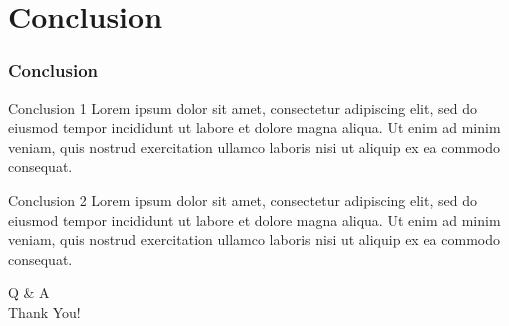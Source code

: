 \documentclass[aspectratio=43, 9pt, utf8, mathserif]{beamer}
\begin{document}
\section{Conclusion}\label{sec:conclusion}
\begin{frame}
\frametitle{Conclusion}
\begin{block}{Conclusion 1}
    Lorem ipsum dolor sit amet, consectetur adipiscing elit, sed do eiusmod tempor incididunt ut labore et dolore magna aliqua.
    Ut enim ad minim veniam, quis nostrud exercitation ullamco laboris nisi ut aliquip ex ea commodo consequat.
\end{block}

\begin{exampleblock}{Conclusion 2}
    Lorem ipsum dolor sit amet, consectetur adipiscing elit, sed do eiusmod tempor incididunt ut labore et dolore magna aliqua.
    Ut enim ad minim veniam, quis nostrud exercitation ullamco laboris nisi ut aliquip ex ea commodo consequat. 
\end{exampleblock}
\end{frame}

\LogoOn
\begin{frame}[noframenumbering]
\centering
\fontsize{40}{50}\selectfont Q \& A\\Thank You!
\end{frame}
\LogoOff
\end{document}
